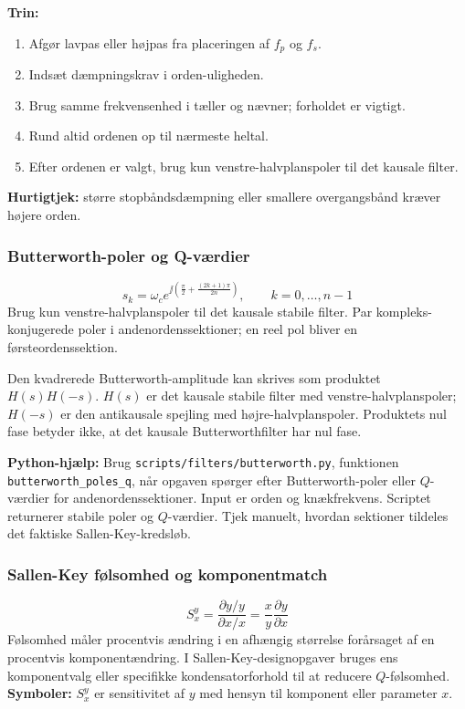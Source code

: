 \textbf{Trin:}
\begin{enumerate}
    \item Afgør lavpas eller højpas fra placeringen af \(f_p\) og \(f_s\).
    \item Indsæt dæmpningskrav i orden-uligheden.
    \item Brug samme frekvensenhed i tæller og nævner; forholdet er vigtigt.
    \item Rund altid ordenen op til nærmeste heltal.
    \item Efter ordenen er valgt, brug kun venstre-halvplanspoler til det kausale filter.
\end{enumerate}

\textbf{Hurtigtjek:} større stopbåndsdæmpning eller smallere overgangsbånd kræver højere orden.

\subsubsection{Butterworth-poler og Q-værdier}
\[
s_k=\omega_c e^{\jj\left(\frac{\pi}{2}+\frac{(2k+1)\pi}{2n}\right)},\qquad k=0,\ldots,n-1
\]
Brug kun venstre-halvplanspoler til det kausale stabile filter. Par kompleks-konjugerede poler i andenordenssektioner; en reel pol bliver en førsteordenssektion.

Den kvadrerede Butterworth-amplitude kan skrives som produktet \(H(s)H(-s)\). \(H(s)\) er det kausale stabile filter med venstre-halvplanspoler; \(H(-s)\) er den antikausale spejling med højre-halvplanspoler. Produktets nul fase betyder ikke, at det kausale Butterworthfilter har nul fase.

\textbf{Python-hjælp:} Brug \texttt{scripts/filters/butterworth.py}, funktionen \texttt{butterworth\_poles\_q}, når opgaven spørger efter Butterworth-poler eller \(Q\)-værdier for andenordenssektioner. Input er orden og knækfrekvens. Scriptet returnerer stabile poler og \(Q\)-værdier. Tjek manuelt, hvordan sektioner tildeles det faktiske Sallen-Key-kredsløb.

\subsubsection{Sallen-Key følsomhed og komponentmatch}
\[
S_x^y=\frac{\partial y/y}{\partial x/x}=\frac{x}{y}\frac{\partial y}{\partial x}
\]
Følsomhed måler procentvis ændring i en afhængig størrelse forårsaget af en procentvis komponentændring. I Sallen-Key-designopgaver bruges ens komponentvalg eller specifikke kondensatorforhold til at reducere \(Q\)-følsomhed.
\textbf{Symboler:} \(S_x^y\) er sensitivitet af \(y\) med hensyn til komponent eller parameter \(x\).

